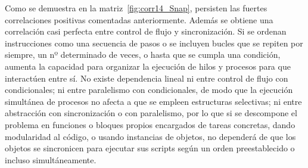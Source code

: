 \documentclass[a4paper, 12pt]{book}
\begin{document}
Como se demuestra en la matriz~\ref{fig:corr14_Snap}, persisten las fuertes correlaciones positivas comentadas anteriormente. Además se obtiene una correlación casi perfecta entre control de flujo y sincronización. Si se ordenan instrucciones como una secuencia de pasos o se incluyen bucles que se repiten por siempre, un nº determinado de veces, o hasta que se cumpla una condición, aumenta la capacidad para organizar la ejecución de hilos y procesos para que interactúen entre sí. No existe dependencia lineal ni entre control de flujo con condicionales; ni entre paralelismo con condicionales, de modo que la ejecución simultánea de procesos no afecta a que se empleen estructuras selectivas; ni entre abstracción con sincronización o con paralelismo, por lo que si se descompone el problema en funciones o bloques propios encargados de tareas concretas, dando modularidad al código, o usando instancias de objetos, no dependerá de que los objetos se sincronicen para ejecutar sus scripts según un orden preestablecido o incluso simultáneamente.
\end{document}
